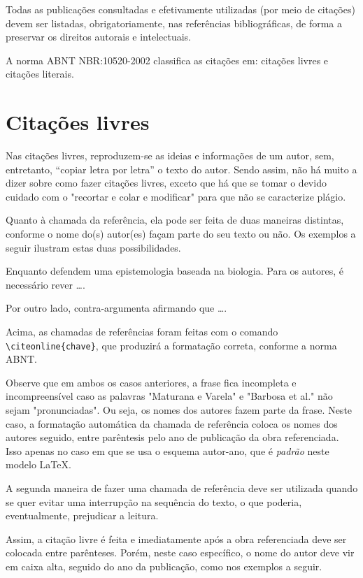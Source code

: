 \begin{apendicesenv}
Todas as publicações consultadas e efetivamente utilizadas (por meio de citações) devem ser listadas, obrigatoriamente, nas referências bibliográficas, de forma a preservar os direitos autorais e intelectuais.

A norma ABNT NBR:10520-2002 classifica as citações em: citações livres e citações literais.

\section{Citações livres}
\label{sec:citacoesLivres}

Nas citações livres, reproduzem-se as ideias e informações de um autor, sem, entretanto, ``copiar letra por letra'' o texto do autor. Sendo assim, não há muito a dizer sobre como fazer citações livres, exceto que há que se tomar o devido cuidado com o "recortar e colar e modificar"{} para que não se caracterize plágio.

Quanto à chamada da referência, ela pode ser feita de duas maneiras distintas, conforme o nome do(s) autor(es) façam parte do seu texto ou não. Os exemplos a seguir ilustram estas duas possibilidades.

Enquanto  defendem uma epistemologia baseada na biologia. Para os autores, é necessário rever \ldots.

Por outro lado,  contra-argumenta afirmando que \ldots.

Acima, as chamadas de referências foram feitas com o comando \verb|\citeonline{chave}|, que produzirá a formatação correta, conforme a norma ABNT.

Observe que em ambos os casos anteriores, a frase fica incompleta e incompreensível caso as palavras "Maturana e Varela"{} e "Barbosa et al."{} não sejam "pronunciadas"{}. Ou seja, os nomes dos autores fazem parte da frase. Neste caso, a formatação automática da chamada de referência coloca os nomes dos autores seguido, entre parêntesis pelo ano de publicação da obra referenciada. Isso apenas no caso em que se usa o esquema autor-ano, que é \textit{padrão} neste modelo \LaTeX{}.

A segunda maneira de fazer uma chamada de referência deve ser utilizada quando se quer evitar uma interrupção na sequência do texto, o que poderia, eventualmente, prejudicar a leitura.

Assim, a citação livre é feita e imediatamente após a obra referenciada deve ser colocada entre parênteses. Porém, neste caso específico, o nome do autor deve vir em caixa alta, seguido do ano da publicação, como nos exemplos a seguir.


\end{apendicesenv}
